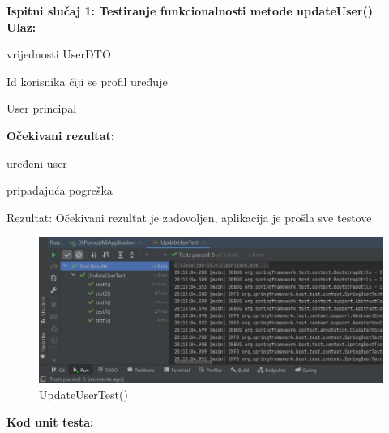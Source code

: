 			\medskip
			
			\noindent \textbf{Ispitni slučaj 1: Testiranje funkcionalnosti metode updateUser()}\\
			
			\medskip
            \noindent\textbf{Ulaz:}
            \begin{packed_enum}
            \item vrijednosti UserDTO
            \item Id korisnika čiji se profil uređuje
            \item User principal
            \end{packed_enum}
            
            \noindent\textbf{Očekivani rezultat:}
            \begin{packed_enum}
            \item uređeni user
            \item pripadajuća pogreška
            \end{packed_enum}
            
            \noindent \text
            Rezultat: Očekivani rezultat je zadovoljen, aplikacija je prošla sve testove \\
            
            \begin{figure}[H]
                 \includegraphics[width=\textwidth, height=\textheight, keepaspectratio]{slike/UpdateUserTest.jpeg}
                \centering
                \caption{UpdateUserTest()}
            \end{figure}
            
            \noindent \textbf{Kod unit testa: }
            
